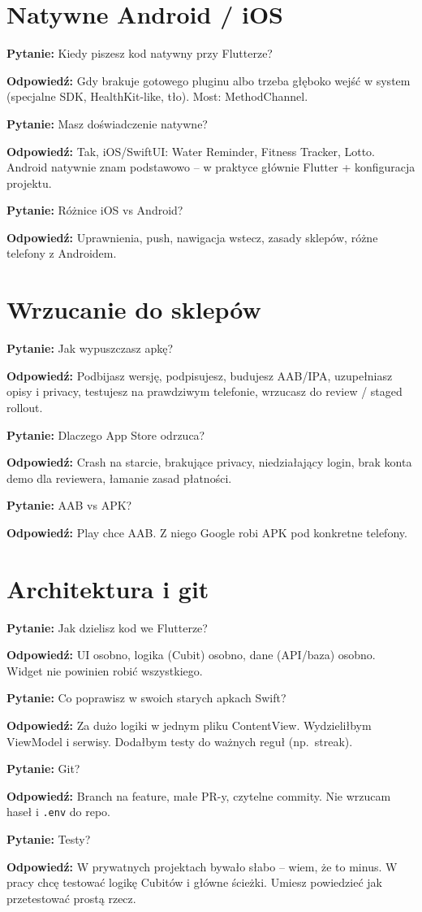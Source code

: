 \documentclass[11pt,a4paper]{article}
\newcommand{\pyt}[1]{\par\medskip\noindent\textbf{Pytanie:} #1\par}
\newcommand{\odp}[1]{\noindent\textbf{Odpowiedź:} #1\par}
\begin{document}
\section{Natywne Android / iOS}

\pyt{Kiedy piszesz kod natywny przy Flutterze?}
\odp{Gdy brakuje gotowego pluginu albo trzeba głęboko wejść w system (specjalne SDK, HealthKit-like, tło). Most: MethodChannel.}

\pyt{Masz doświadczenie natywne?}
\odp{Tak, iOS/SwiftUI: Water Reminder, Fitness Tracker, Lotto. Android natywnie znam podstawowo -- w praktyce głównie Flutter + konfiguracja projektu.}

\pyt{Różnice iOS vs Android?}
\odp{Uprawnienia, push, nawigacja wstecz, zasady sklepów, różne telefony z Androidem.}

\section{Wrzucanie do sklepów}

\pyt{Jak wypuszczasz apkę?}
\odp{Podbijasz wersję, podpisujesz, budujesz AAB/IPA, uzupełniasz opisy i privacy, testujesz na prawdziwym telefonie, wrzucasz do review / staged rollout.}

\pyt{Dlaczego App Store odrzuca?}
\odp{Crash na starcie, brakujące privacy, niedziałający login, brak konta demo dla reviewera, łamanie zasad płatności.}

\pyt{AAB vs APK?}
\odp{Play chce AAB. Z niego Google robi APK pod konkretne telefony.}

\section{Architektura i git}

\pyt{Jak dzielisz kod we Flutterze?}
\odp{UI osobno, logika (Cubit) osobno, dane (API/baza) osobno. Widget nie powinien robić wszystkiego.}

\pyt{Co poprawisz w swoich starych apkach Swift?}
\odp{Za dużo logiki w jednym pliku ContentView. Wydzieliłbym ViewModel i serwisy. Dodałbym testy do ważnych reguł (np.\ streak).}

\pyt{Git?}
\odp{Branch na feature, małe PR-y, czytelne commity. Nie wrzucam haseł i \texttt{.env} do repo.}

\pyt{Testy?}
\odp{W prywatnych projektach bywało słabo -- wiem, że to minus. W pracy chcę testować logikę Cubitów i główne ścieżki. Umiesz powiedzieć jak przetestować prostą rzecz.}
\end{document}
